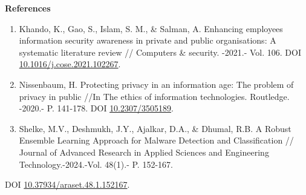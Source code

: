\begin{center}
{\bfseries References}
\end{center}

\begin{references}
\begin{enumerate}
\def\labelenumi{\arabic{enumi}.}
\item
  Khando, K., Gao, S., Islam, S. M., \& Salman, A. Enhancing employees
  information security awareness in private and public organisations: A
  systematic literature review // Computers \& security. -2021.- Vol.
  106. DOI
  \href{https://doi.org/10.1016/j.cose.2021.102267}{10.1016/j.cose.2021.102267}.
\item
  Nissenbaum, H. Protecting privacy in an information age: The problem
  of privacy in public //In The ethics of information technologies.
  Routledge. -2020.- P. 141-178. DOI
  \href{https://doi.org/10.2307/3505189}{10.2307/3505189}.
\item
  Shelke, M.V., Deshmukh, J.Y., Ajalkar, D.A., \& Dhumal, R.B. A Robust
  Ensemble Learning Approach for Malware Detection and Classification //
  Journal of Advanced Research in Applied Sciences and Engineering
  Technology.-2024.-Vol. 48(1).- P. 152-167.
\end{enumerate}

DOI
\href{https://doi.org/10.37934/araset.48.1.152167}{10.37934/araset.48.1.152167}.


\end{references}
